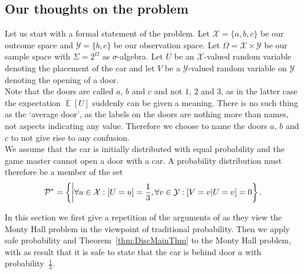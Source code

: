 \documentclass[a4paper]{report}
\theoremstyle{plain}
\theoremstyle{definition}
\theoremstyle{remark}
\numberwithin{equation}{chapter}
\let\P\relax
\DeclareMathOperator{\P}{\mathbb{P}}
\DeclareMathOperator{\E}{\mathbb{E}}
\DeclareMathOperator{\1}{\mathbbm{1}}
\newcommand{\X}{\mathcal{X}}
\newcommand{\Y}{\mathcal{Y}}
\newcommand{\Pmod}{\mathcal{P}^*}
\begin{document}
\subsection{Our thoughts on the problem}
Let us start with a formal statement of the problem. Let $\X=\{a,b,c\}$ be our outcome space and $\Y=\{b,c\}$ be our observation space. Let $\Omega=\X\times\Y$ be our sample space with $\Sigma=2^\Omega$ as $\sigma$-algebra. Let $U$ be an $\X$-valued random variable denoting the placement of the car and let $V$ be a $\Y$-valued random variable on $\Y$ denoting the opening of a door.\\
Note that the doors are called $a$, $b$ and $c$ and not $1$, $2$ and $3$, as in the latter case the expectation $\E[U]$ suddenly can be given a meaning. There is no such thing as the `average door', as the labels on the doors are nothing more than names, not aspects indicating any value. Therefore we choose to name the doors $a$, $b$ and $c$ to not give rise to any confusion.\\
We assume that the car is initially distributed with equal probability and the game master cannot open a door with a car. A probability distribution must therefore be a member of the set
\begin{equation}
\Pmod=\left\{\P\middle|\forall u\in\X:\P[U=u]=\frac{1}{3},\forall v\in\Y:\P[V=v|U=v]=0\right\}.
\end{equation}

In this section we first give a repetition of the arguments of \cite{Grunwald13} as they view the Monty Hall problem in the viewpoint of traditional probability. Then we apply safe probability and Theorem~\ref{thm:DiscMainThm} to the Monty Hall problem, with as result that it is safe to state that the car is behind door $a$ with probability~$\frac{1}{3}$.
\end{document}
